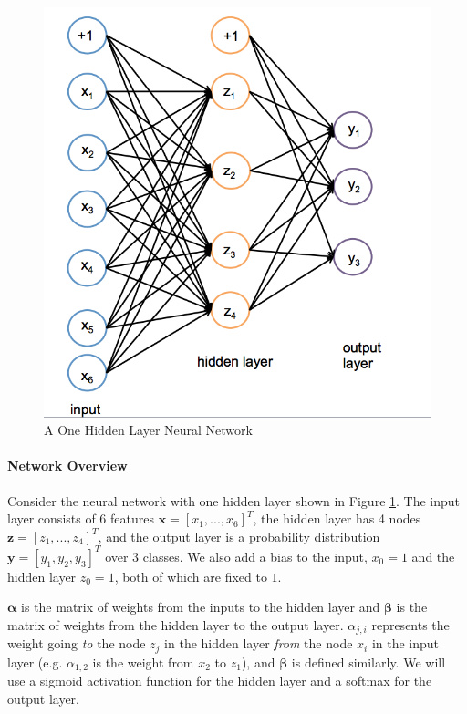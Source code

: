 \documentclass[11pt]{article}
\numberwithin{equation}{section} %
\numberwithin{figure}{section} %
\numberwithin{table}{section} %
\newcommand{\xv}{\mathbf{x}}
\newcommand{\yv}{\mathbf{y}}
\newcommand{\zv}{\mathbf{z}}
\begin{document}
 \begin{figure}[h]
        \centering
        \includegraphics[scale=0.8]{img/oneHL6.png}
        \caption{A One Hidden Layer Neural Network}
        \label{fig:oneHL}
    \end{figure}

\paragraph{Network Overview}
Consider the neural network with one hidden layer shown in Figure \ref{fig:oneHL}. The input layer consists of 6 features $\xv = [x_1,...,x_6]^T$, the hidden layer has 4  nodes $\zv = [z_1,...,z_4]^T$, and the output layer is a probability distribution $\yv = [y_1, y_2, y_3]^T$ over 3 classes. We also add a bias to the input, $x_0 = 1$ and the hidden layer $z_0 = 1$, both of which are fixed to $1$.

$\boldsymbol{\alpha}$ is the matrix of weights from the inputs to the hidden layer and $\boldsymbol{\beta}$ is the matrix of weights from the hidden layer to the output layer. 
$\alpha_{j,i}$ represents the weight going \textit{to} the node $z_j$ in the hidden layer \textit{from} the node $x_i$ in the input layer (e.g. $\alpha_{1,2}$ is the weight from $x_2$ to $z_1$), and $\boldsymbol{\beta}$ is defined similarly. We will use a sigmoid activation function for the hidden layer and a softmax for the output layer. 
\end{document}
